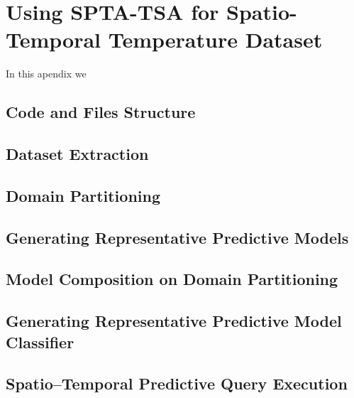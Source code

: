 \chapter{Using SPTA-TSA for Spatio-Temporal Temperature Dataset}
\label{apendiceA}

In this apendix we 

\section{Code and Files Structure}


\section{Dataset Extraction}




\section{Domain Partitioning}



\section{Generating Representative Predictive Models}


\section{Model Composition on Domain Partitioning}


\section{Generating Representative Predictive Model Classifier}


\section{Spatio--Temporal Predictive Query Execution}

